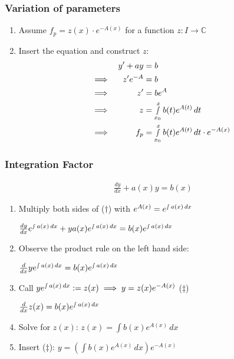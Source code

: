 \documentclass[a4paper, 10pt]{article}
\theoremstyle{definition}
\newcommand{\C}{\mathbb{C}}
\begin{document}
\subsubsection*{Variation of parameters}
\begin{enumerate}
    \item Assume \(f_p = z(x) \cdot e^{-A(x)}\) for a function \(z: I \to \C\)
    \item Insert the equation and construct \(z\):
    \begin{align*}
        &&y' + ay &= b \\
        &\implies& z'e^{-A} &= b \\
        &\implies& z' &= be^{A} \\
        &\implies& z &= \smallint_{x_0}^x b(t)e^{A(t)}\,dt \\
        &\implies& f_p &= \smallint_{x_0}^x b(t) e^{A(t)}\,dt \cdot e^{-A(x)}
    \end{align*}
\end{enumerate}

\subsubsection*{Integration Factor}
\begin{align}
    \tag{\(\dagger\)} \frac{dy}{dx} + a(x) y = b(x)
\end{align}
\begin{enumerate}
    \item Multiply both sides of (\(\dagger\)) with \(e^{A(x)} = e^{\smallint a(x)\,dx}\) \par
    \centering
    \(\frac{dy}{dx} e^{\smallint a(x)\,dx} + ya(x)e^{\smallint a(x)\,dx} = b(x)e^{\smallint a(x)\,dx}\)
    \item \raggedright Observe the product rule on the left hand side: \par
    \centering
    \(\frac{d}{dx}ye^{\smallint a(x)\,dx} = b(x)e^{\smallint a(x)\,dx}\)
    \item \raggedright Call \(y e^{\smallint a(x)\,dx}:=z(x) \implies y = z(x)e^{-A(x)}\) (\(\ddagger\)) \par
    \centering
    \(\frac{d}{dx}z(x) = b(x)e^{\smallint a(x)\,dx}\)
    \item \raggedright Solve for \(z(x)\): \(z(x) = \int b(x) e^{A(x)}\,dx\)
    \item \raggedright Insert (\(\ddagger\)):
    \(y = \left(\int b(x)e^{A(x)} \,dx\right) e^{-A(x)}\)
\end{enumerate}
\end{document}
